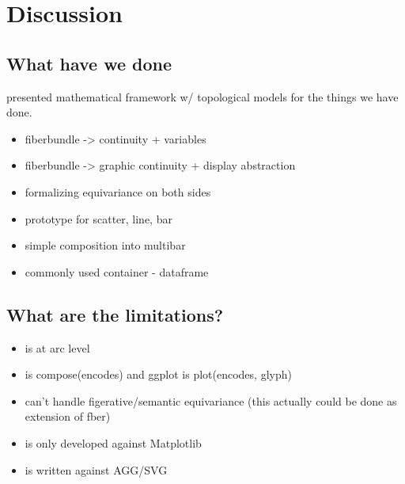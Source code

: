 \documentclass[../main.tex]{subfiles}
\begin{document}
\section{Discussion}

\subsection{What have we done}
presented mathematical framework w/ topological models for the things we have done. 
 \begin{itemize}
    \item fiberbundle -> continuity + variables
    \item fiberbundle -> graphic continuity + display abstraction
    \item formalizing equivariance on both sides 
    \item prototype for scatter, line, bar
    \item simple composition into multibar
    \item commonly used container - dataframe
 \end{itemize}

\subsection{What are the limitations?}
\begin{itemize}
\item is at arc level
\item is compose(encodes) and ggplot is plot(encodes, glyph)
\item can't handle figerative/semantic equivariance (this actually could be done as extension of fber)
\item is only developed against Matplotlib
\item is written against AGG/SVG
\end{itemize}
\end{document}
